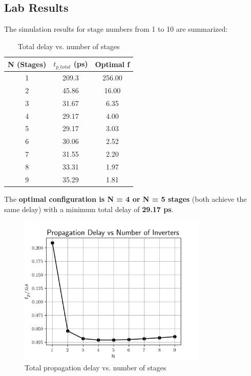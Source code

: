 \documentclass[UTF8,12pt,a4paper]{ctexart}
\begin{document}
\subsection{Lab Results}

The simulation results for stage numbers from 1 to 10 are summarized:

\begin{table}[h]
\centering
\begin{tabular}{ccc}
\toprule
\textbf{N (Stages)} & \textbf{$t_{p\_total}$ (ps)} & \textbf{Optimal f} \\
\midrule
1 & 209.3 & 256.00 \\
2 & 45.86 & 16.00 \\
3 & 31.67 & 6.35 \\
4 & 29.17 & 4.00 \\
5 & 29.17 & 3.03 \\
6 & 30.06 & 2.52 \\
7 & 31.55 & 2.20 \\
8 & 33.31 & 1.97 \\
9 & 35.29 & 1.81 \\
\bottomrule
\end{tabular}
\caption{Total delay vs. number of stages}
\end{table}

The \textbf{optimal configuration is N = 4 or N = 5 stages} (both achieve the same delay) with a minimum total delay of \textbf{29.17 ps}.

\begin{figure}[h]
\centering
\includegraphics[width=0.8\textwidth]{Task5/tp_N.png}
\caption{Total propagation delay vs. number of stages}
\label{fig:task5_delay}
\end{figure}
\end{document}
